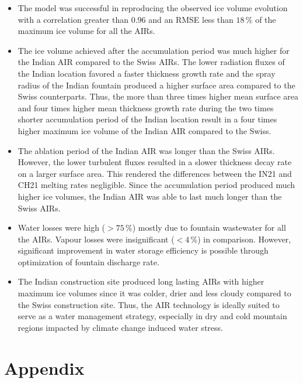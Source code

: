\documentclass[utf8]{frontiersSCNS}
\begin{document}
\begin{itemize}
	\item The model was successful in reproducing the observed ice volume evolution with a correlation greater
	      than $0.96$ and an RMSE less than $18 \, \%$ of the maximum ice volume for all the AIRs.

	\item The ice volume achieved after the accumulation period was much higher for the Indian AIR compared to the
	      Swiss AIRs. The lower radiation fluxes of the Indian location favored a faster thickness growth rate and the
	      spray radius of the Indian fountain produced a higher surface area compared to the Swiss counterparts. Thus,
        the more than three times higher mean surface area and four times higher mean thickness growth rate
        during the two times shorter accumulation period of the Indian location result in a four times higher
        maximum ice volume of the Indian AIR compared to the Swiss.

	\item The ablation period of the Indian AIR was longer than the Swiss AIRs. However, the lower turbulent fluxes resulted in
	      a slower thickness decay rate on a larger surface area. This rendered the differences between the IN21 and CH21
	      melting rates negligible. Since the accumulation period produced much higher ice volumes, the Indian AIR was
	      able to last much longer than the Swiss AIRs.

	\item Water losses were high ($>75\,\%$) mostly due to fountain wastewater for all the AIRs. Vapour losses were
	      insignificant ($<4\,\%$) in comparison. However, significant improvement in water storage efficiency is possible
	      through optimization of fountain discharge rate.

  \item The Indian construction site produced long lasting AIRs with higher maximum ice volumes since it was
    colder, drier and less cloudy compared to the Swiss construction site. Thus, the AIR technology is ideally
    suited to serve as a water management strategy, especially in dry and cold mountain regions impacted by
    climate change induced water stress.

\end{itemize}

\section{Appendix}
\end{document}
